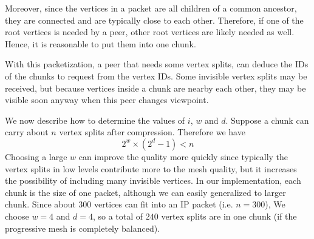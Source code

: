     Moreover, since the vertices in a packet are all children of a
    common ancestor, they are connected and are typically close to
    each other. Therefore, if one of the root vertices is needed by a
    peer, other root vertices are likely needed as well. Hence,
    it is reasonable to put them into one chunk.
    
    With this packetization, a peer that needs some vertex splits,
    can deduce the IDs of the chunks to
    request from the vertex IDs. Some invisible vertex splits may be received, but 
    because vertices inside a chunk are nearby each other, 
    they may be visible soon anyway when this peer changes viewpoint. 
    
    We now describe how to determine the values of $i$, $w$ and $d$.
    Suppose a chunk can carry about $n$ vertex splits after compression. 
    Therefore we have  
    \begin{displaymath}
    2^{w} \times (2^{d} - 1) < n 
    \end{displaymath}
    Choosing a large $w$ can improve the quality more quickly since 
    typically the vertex splits in low levels contribute more
    to the mesh quality,
    but it increases the possibility of including many invisible
    vertices.
    In our implementation, each chunk is the size of one packet, although we can easily generalized to larger chunk.  Since about 300 vertices can fit into an IP packet 
    (i.e. $n=300$),
    We choose $w=4$ and $d=4$, so a total of $240$ vertex splits are 
    in one chunk (if the progressive mesh is completely balanced).

